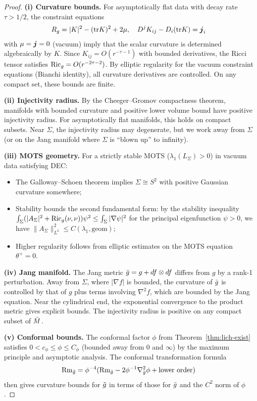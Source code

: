 \begin{proof}
\textbf{(i) Curvature bounds.} For asymptotically flat data with decay rate $\tau > 1/2$, the constraint equations
\[
R_g = |K|^2 - (\mathrm{tr} K)^2 + 2\mu, \quad D^j K_{ij} - D_i(\mathrm{tr} K) = \boldsymbol{j}_i
\]
with $\mu = \boldsymbol{j} = 0$ (vacuum) imply that the scalar curvature is determined algebraically by $K$. Since $K_{ij} = O(r^{-\tau-1})$ with bounded derivatives, the Ricci tensor satisfies $\mathrm{Ric}_g = O(r^{-2\tau-2})$. By elliptic regularity for the vacuum constraint equations (Bianchi identity), all curvature derivatives are controlled. On any compact set, these bounds are finite.

\textbf{(ii) Injectivity radius.} By the Cheeger--Gromov compactness theorem, manifolds with bounded curvature and positive lower volume bound have positive injectivity radius. For asymptotically flat manifolds, this holds on compact subsets. Near $\Sigma$, the injectivity radius may degenerate, but we work away from $\Sigma$ (or on the Jang manifold where $\Sigma$ is ``blown up'' to infinity).

\textbf{(iii) MOTS geometry.} For a strictly stable MOTS ($\lambda_1(L_\Sigma) > 0$) in vacuum data satisfying DEC:
\begin{itemize}
    \item The Galloway--Schoen theorem \cite{gallowayschoen2006} implies $\Sigma \cong S^2$ with positive Gaussian curvature somewhere;
    \item Stability bounds the second fundamental form: by the stability inequality $\int_\Sigma (|A_\Sigma|^2 + \mathrm{Ric}_g(\nu,\nu))\psi^2 \leq \int_\Sigma |\nabla\psi|^2$ for the principal eigenfunction $\psi > 0$, we have $\|A_\Sigma\|_{L^2}^2 \leq C(\lambda_1, \text{geom})$;
    \item Higher regularity follows from elliptic estimates on the MOTS equation $\theta^+ = 0$.
\end{itemize}

\textbf{(iv) Jang manifold.} The Jang metric $\bar{g} = g + df \otimes df$ differs from $g$ by a rank-1 perturbation. Away from $\Sigma$, where $|\nabla f|$ is bounded, the curvature of $\bar{g}$ is controlled by that of $g$ plus terms involving $\nabla^2 f$, which are bounded by the Jang equation. Near the cylindrical end, the exponential convergence to the product metric gives explicit bounds. The injectivity radius is positive on any compact subset of $\bar{M}$.

\textbf{(v) Conformal bounds.} The conformal factor $\phi$ from Theorem~\ref{thm:lich-exist} satisfies $0 < c_\phi \leq \phi \leq C_\phi$ (bounded away from 0 and $\infty$) by the maximum principle and asymptotic analysis. The conformal transformation formula
\[
\mathrm{Rm}_{\tilde{g}} = \phi^{-4}(\mathrm{Rm}_{\bar{g}} - 2\phi^{-1}\nabla^2_{\bar{g}}\phi + \text{lower order})
\]
then gives curvature bounds for $\tilde{g}$ in terms of those for $\bar{g}$ and the $C^2$ norm of $\phi$.
\end{proof}

